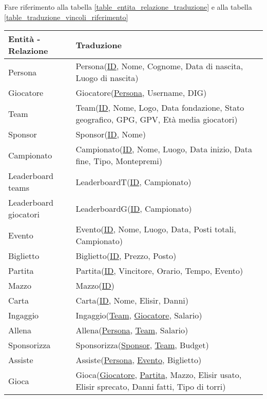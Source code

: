 \documentclass{article}
\begin{document}
Fare riferimento alla tabella \ref{table_entita_relazione_traduzione} e alla tabella \ref{table_traduzione_vincoli_riferimento}

\begin{table}
    \centering
    \begin{tabularx}{\textwidth}{|l|X|}
        \hline
        \textbf{Entità - Relazione} & \textbf{Traduzione} \\ \hline
        Persona & Persona(\underline{ID}, Nome, Cognome, Data di nascita, Luogo di nascita) \\ \hline
        Giocatore & Giocatore(\underline{Persona}, Username, DIG) \\ \hline
        Team & Team(\underline{ID}, Nome, Logo, Data fondazione, Stato geografico, GPG, GPV, Età media giocatori) \\ \hline
        Sponsor & Sponsor(\underline{ID}, Nome) \\ \hline
        Campionato & Campionato(\underline{ID}, Nome, Luogo, Data inizio, Data fine, Tipo, Montepremi) \\ \hline
        Leaderboard teams & LeaderboardT(\underline{ID}, Campionato)  \\ \hline
        Leaderboard giocatori & LeaderboardG(\underline{ID}, Campionato) \\ \hline
        Evento & Evento(\underline{ID}, Nome, Luogo, Data, Posti totali, Campionato) \\ \hline
        Biglietto & Biglietto(\underline{ID}, Prezzo, Posto) \\ \hline
        Partita & Partita(\underline{ID}, Vincitore, Orario, Tempo, Evento) \\ \hline
        Mazzo & Mazzo(\underline{ID}) \\ \hline %
        Carta & Carta(\underline{ID}, Nome, Elisir, Danni) \\ \hline
        Ingaggio & Ingaggio(\underline{Team}, \underline{Giocatore}, Salario) \\ \hline
        Allena & Allena(\underline{Persona}, \underline{Team}, Salario) \\ \hline
        Sponsorizza & Sponsorizza(\underline{Sponsor}, \underline{Team}, Budget) \\ \hline
        Assiste & Assiste(\underline{Persona}, \underline{Evento}, Biglietto) \\ \hline
        Gioca & Gioca(\underline{Giocatore}, \underline{Partita}, Mazzo, Elisir usato, Elisir sprecato, Danni fatti, Tipo di torri) \\ \hline

\end{tabularx}
\end{table}
\end{document}
